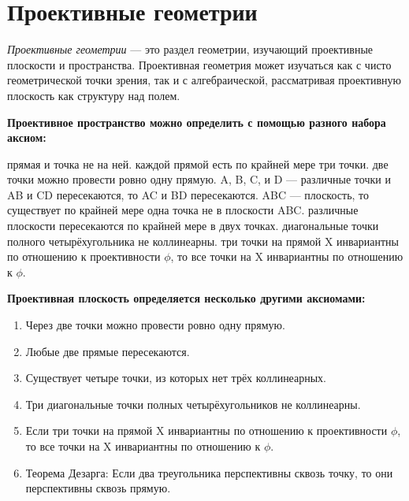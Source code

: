 \documentclass[12pt]{article}
\begin{document}
\section{Проективные геометрии}
\textit{Проективные геометрии} — это раздел геометрии, изучающий проективные плоскости и пространства. Проективная геометрия может изучаться как с чисто геометрической точки зрения, так и с алгебраической, рассматривая проективную плоскость как структуру над полем.\newline

\textbf{Проективное пространство можно определить с помощью разного набора аксиом:}
\begin{enumerate}
     прямая и точка не на ней.
     каждой прямой есть по крайней мере три точки.
     две точки можно провести ровно одну прямую.
     A, B, C, и D — различные точки и AB и CD пересекаются, то AC и BD пересекаются.
     ABC — плоскость, то существует по крайней мере одна точка не в плоскости ABC.
     различные плоскости пересекаются по крайней мере в двух точках.
     диагональные точки полного четырёхугольника не коллинеарны.
     три точки на прямой X инвариантны по отношению к проективности $\phi$, то все точки на X инвариантны по отношению к $\phi$.\newline\newline
\end{enumerate}

\textbf{Проективная плоскость определяется несколько другими аксиомами:}
\begin{enumerate}
    \item Через две точки можно провести ровно одну прямую.
    \item Любые две прямые пересекаются.
    \item Существует четыре точки, из которых нет трёх коллинеарных.
    \item Три диагональные точки полных четырёхугольников не коллинеарны.
    \item Если три точки на прямой X инвариантны по отношению к проективности $\phi$, то все точки на X инвариантны по отношению к $\phi$.
    \item Теорема Дезарга: Если два треугольника перспективны сквозь точку, то они перспективны сквозь прямую.\newline\newline
\end{enumerate}
\end{document}

